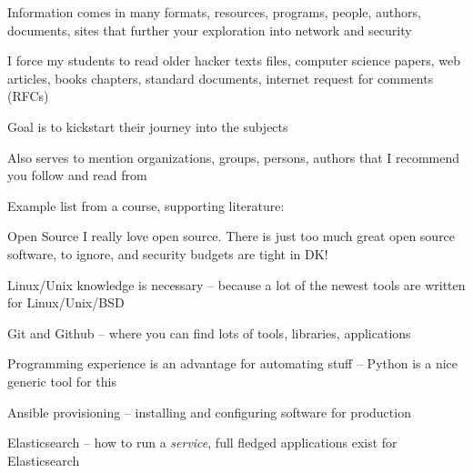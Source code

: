 \documentclass[Screen16to9,17pt]{foils}
\begin{document}



\begin{quote}

\end{quote}

\begin{list2}
\item Information comes in many formats, resources, programs, people, authors, documents, sites
that further your exploration into network and security

\item I force my students to read older hacker texts files, computer science papers, web articles, books chapters, standard documents, internet request for comments (RFCs)

\item Goal is to kickstart their journey into the subjects

\item Also serves to mention organizations, groups, persons, authors that I recommend you follow and read from
\end{list2}

Example list from a course, supporting literature:\\








\begin{quote}

\end{quote}

\begin{list2}
\item Open Source I really love open source. There is just too much great open source software, to ignore, and security budgets are tight in DK!
\item Linux/Unix knowledge is necessary
-- because a lot of the newest tools are written for Linux/Unix/BSD
\item Git and Github -- where you can find lots of tools, libraries, applications
\item Programming experience is an advantage for automating stuff -- Python is a nice generic tool for this
\item Ansible provisioning -- installing and configuring software for production
\item Elasticsearch -- how to run a \emph{service}, full fledged applications exist for Elasticsearch
\end{list2}
\end{document}
